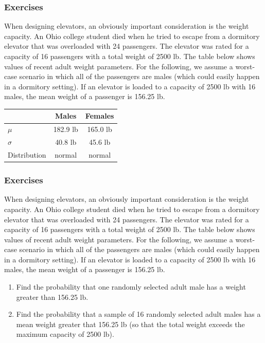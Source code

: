 \documentclass[xcolor=dvipsnames]{beamer}
\begin{document}
\begin{frame}
  \frametitle{Exercises} 
  {\ubung} When designing elevators, an obviously important
  consideration is the weight capacity. An Ohio college student died
  when he tried to escape from a dormitory elevator that was
  overloaded with 24 passengers. The elevator was rated for a capacity
  of 16 passengers with a total weight of 2500 lb. The table below
  shows values of recent adult weight parameters. For the following,
  we assume a worst-case scenario in which all of the passengers are
  males (which could easily happen in a dormitory setting). If an
  elevator is loaded to a capacity of 2500 lb with 16 males, the mean
  weight of a passenger is 156.25 lb.

\medskip

  \begin{tabular}{|l|c|c|}\hline
    & Males & Females \\ \hline
    $\mu$ & 182.9 lb & 165.0 lb \\ \hline
    $\sigma$ & 40.8 lb & 45.6 lb \\ \hline 
    Distribution & normal & normal \\ \hline
  \end{tabular}
\end{frame}

\begin{frame}
  \frametitle{Exercises} 
  {\ubung} When designing elevators, an obviously important
  consideration is the weight capacity. An Ohio college student died
  when he tried to escape from a dormitory elevator that was
  overloaded with 24 passengers. The elevator was rated for a capacity
  of 16 passengers with a total weight of 2500 lb. The table below
  shows values of recent adult weight parameters. For the following,
  we assume a worst-case scenario in which all of the passengers are
  males (which could easily happen in a dormitory setting). If an
  elevator is loaded to a capacity of 2500 lb with 16 males, the mean
  weight of a passenger is 156.25 lb.
  \begin{enumerate}
  \item<1-> Find the probability that one randomly selected adult male
    has a weight greater than 156.25 lb.
  \item<2-> Find the probability that a sample of 16 randomly selected
    adult males has a mean weight greater that 156.25 lb (so that the
    total weight exceeds the maximum capacity of 2500 lb).
  \end{enumerate}
\end{frame}
\end{document}

